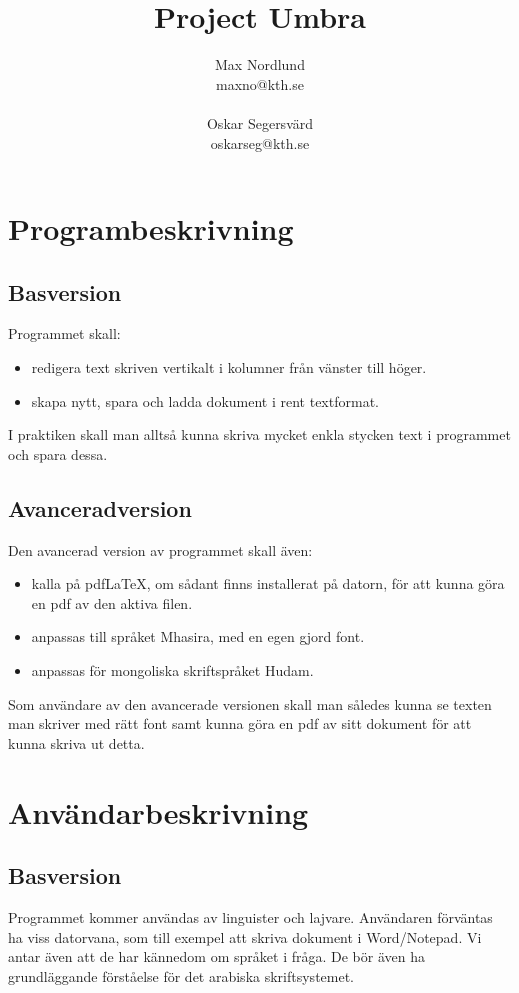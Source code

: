 \documentclass[a4paper,11p,twoside]{report}
\title{Project Umbra}
\author{Max Nordlund\\ maxno@kth.se \\ \\ Oskar Segersvärd \\ oskarseg@kth.se}
\begin{document}
\maketitle

\pagebreak

\section{Programbeskrivning}
\subsection{Basversion}
Programmet skall:
\begin{itemize}
	\item redigera text skriven vertikalt i kolumner från vänster till höger.
	\item skapa nytt, spara och ladda dokument i rent textformat.
\end{itemize}
I praktiken skall man alltså kunna skriva mycket enkla stycken text i programmet och spara dessa.

\subsection{Avanceradversion}
Den avancerad version av programmet skall även:
\begin{itemize}
	\item kalla på pdf\LaTeX, om sådant finns installerat på datorn, för att kunna göra en pdf av den aktiva filen.
	\item anpassas till språket Mhasira, med en egen gjord font.
	\item anpassas för mongoliska skriftspråket Hudam.
\end{itemize}
Som användare av den avancerade versionen skall man således kunna se texten man skriver med rätt font samt kunna göra en pdf av sitt dokument för att kunna skriva ut detta.

\section{Användarbeskrivning}
\subsection{Basversion}
Programmet kommer användas av linguister och lajvare. Användaren förväntas ha viss datorvana, som till exempel att skriva dokument i Word/Notepad. Vi antar även att de har kännedom om språket i fråga. De bör även ha grundläggande förståelse för det arabiska skriftsystemet. 
\end{document}
